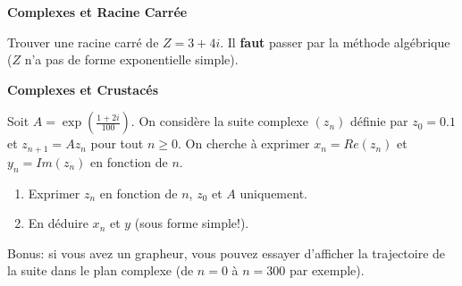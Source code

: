 \documentclass[a4paper,12pt]{article}\usepackage[]{graphicx}\usepackage[]{color}
\begin{document}
\Exo \textbf{Complexes et Racine Carrée}

Trouver une racine carré de $Z = 3+4i$. Il \textbf{faut} passer par la méthode algébrique ($Z$ n'a pas de forme exponentielle simple).

\Exo \textbf{Complexes et Crustacés}

Soit $\displaystyle A = \exp\left( \frac{1 + 2i}{100} \right)$. On considère la suite complexe $(z_n)$ définie par $z_0 = 0.1$ et $z_{n+1} = A z_n$ pour tout $n \geq 0$.
On cherche à exprimer $x_n = Re(z_n)$ et $y_n = Im(z_n)$ en fonction de $n$. 
\begin{enumerate}
\item Exprimer $z_n$ en fonction de $n$, $z_0$ et $A$ uniquement. 
\item En déduire $x_n$ et $y$ (sous forme simple!). 
\end{enumerate}

Bonus: si vous avez un grapheur, vous pouvez essayer d'afficher la trajectoire de la suite dans le plan complexe (de $n=0$ à $n=300$ par exemple). 
\end{document}
